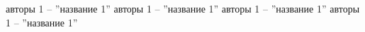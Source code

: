 \newpage
{}
\begin{thebibliography}{9}
      авторы 1  --  ''название 1''
      авторы 1  --  ''название 1''
      авторы 1  --  ''название 1''
      авторы 1  --  ''название 1''
\end{thebibliography}